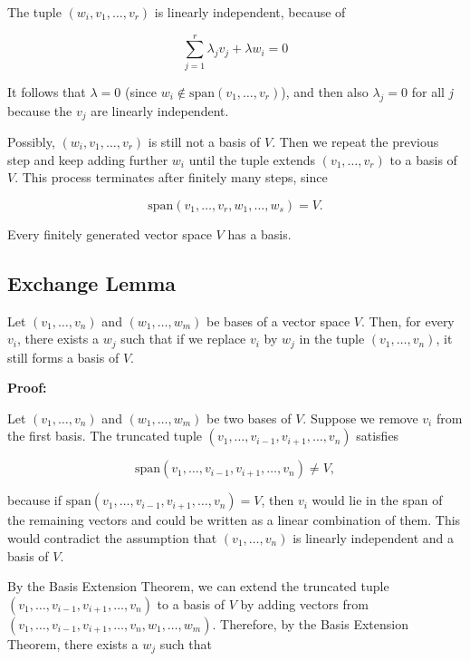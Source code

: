The tuple \((w_i, v_1, \ldots, v_r)\) is linearly independent, because of

\[
	\sum_{j=1}^r \lambda_j v_j + \lambda w_i = 0
\]

It follows that \(\lambda = 0\) (since \(w_i \notin \text{span}(v_1, \ldots, v_r)\)), and then also 
\(\lambda_j = 0\) for all \emph{j} because the \(v_j\) are linearly independent.

Possibly, \((w_i, v_1, \ldots, v_r)\) is still not a basis of \(V\). Then we repeat the previous step and 
keep adding further \(w_i\) until the tuple extends \((v_1, \ldots, v_r)\) to a basis of \(V\). This 
process terminates after finitely many steps, since

\[
	\text{span}(v_1, \ldots, v_r, w_1, \ldots, w_s) = V.
\]

\QED
\vspace{\baselineskip}

Every finitely generated vector space \(V\) has a basis.

\subsection{Exchange Lemma}

Let \((v_1, \ldots, v_n)\) and \((w_1, \ldots, w_m)\) be bases of a vector space \(V\). Then, for every 
\(v_i\), there exists a \(w_j\) such that if we replace \(v_i\) by \(w_j\) in the tuple 
\((v_1, \ldots, v_n)\), it still forms a basis of \(V\).
\vspace{\baselineskip}

\textbf{Proof:}

Let \((v_1, \ldots, v_n)\) and \((w_1, \ldots, w_m)\) be two bases of \(V\). Suppose we remove \(v_i\) 
from the first basis. The truncated tuple \((v_1, \ldots, v_{i-1}, v_{i+1}, \ldots, v_n)\) satisfies

\[
	\text{span}(v_1, \ldots, v_{i-1}, v_{i+1}, \ldots, v_n) \neq V,
\]

because if \(\text{span}(v_1, \ldots, v_{i-1}, v_{i+1}, \ldots, v_n) = V\), then \(v_i\) would lie in the 
span of the remaining vectors and could be written as a linear combination of them. This would contradict 
the assumption that \((v_1, \ldots, v_n)\) is linearly independent and a basis of \(V\).

By the Basis Extension Theorem, we can extend the truncated 
tuple \((v_1, \ldots, v_{i-1}, v_{i+1}, \ldots, v_n)\) to a basis of \(V\) by 
adding vectors from \((v_1, \ldots, v_{i-1}, v_{i+1}, \ldots, v_n, w_1, \ldots, w_m)\). 
Therefore, by the Basis Extension Theorem, there exists a \(w_j\) such that

